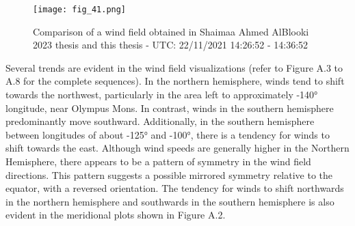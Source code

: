 \FloatBarrier
\begin{figure}[h!] 
    \centering
    \texttt{[image: fig\_41.png]}
    \caption{Comparison of a wind field obtained in Shaimaa Ahmed AlBlooki 2023 thesis and this thesis - UTC: 22/11/2021 14:26:52 - 14:36:52}
\end{figure}
\FloatBarrier
Several trends are evident in the wind field visualizations (refer to Figure A.3 to A.8 for the complete sequences). In the northern hemisphere, winds tend to shift towards the northwest, particularly in the area left to approximately -140° longitude, near Olympus Mons. In contrast, winds in the southern hemisphere predominantly move southward. Additionally, in the southern hemisphere between longitudes of about -125° and -100°, there is a tendency for winds to shift towards the east.
Although wind speeds are generally higher in the Northern Hemisphere, there appears to be a pattern of symmetry in the wind field directions. This pattern suggests a possible mirrored symmetry relative to the equator, with a reversed orientation. The tendency for winds to shift northwards in the northern hemisphere and southwards in the southern hemisphere is also evident in the meridional plots shown in Figure A.2.